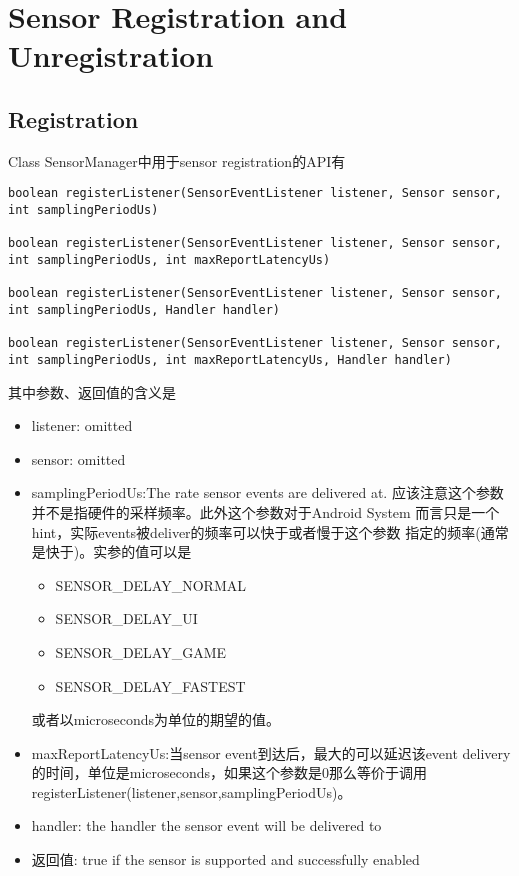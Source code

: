 \documentclass{article}
\begin{document}
{\section{Sensor Registration and Unregistration}
\subsection{Registration}
Class SensorManager中用于sensor registration的API有
\begin{lstlisting}
boolean registerListener(SensorEventListener listener, Sensor sensor, int samplingPeriodUs)

boolean registerListener(SensorEventListener listener, Sensor sensor, int samplingPeriodUs, int maxReportLatencyUs)

boolean registerListener(SensorEventListener listener, Sensor sensor, int samplingPeriodUs, Handler handler)

boolean registerListener(SensorEventListener listener, Sensor sensor, int samplingPeriodUs, int maxReportLatencyUs, Handler handler)
\end{lstlisting}
其中参数、返回值的含义是
\begin{itemize}
  \item listener: omitted
  \item sensor: omitted
  \item samplingPeriodUs:The rate sensor events are delivered at. 
    应该注意这个参数并不是指硬件的采样频率。此外这个参数对于Android System
    而言只是一个hint，实际events被deliver的频率可以快于或者慢于这个参数
    指定的频率(通常是快于)。实参的值可以是
      \begin{itemize}
        \item SENSOR\_DELAY\_NORMAL
        \item SENSOR\_DELAY\_UI
        \item SENSOR\_DELAY\_GAME
        \item SENSOR\_DELAY\_FASTEST
      \end{itemize}
      或者以microseconds为单位的期望的值。
  \item maxReportLatencyUs:当sensor event到达后，最大的可以延迟该event delivery
    的时间，单位是microseconds，如果这个参数是0那么等价于调用
    registerListener(listener,sensor,samplingPeriodUs)。
  \item handler: the handler the sensor event will be delivered to
  \item 返回值: true if the sensor is supported and successfully enabled
\end{itemize}


}
\end{document}
